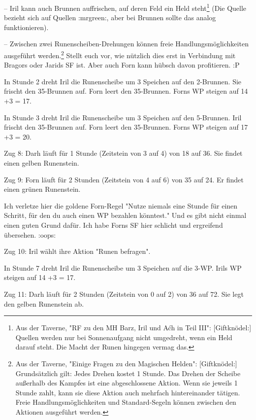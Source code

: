 \documentclass[10pt, a4paper, oneside]{book}
\begin{document}
{– Iril kann auch Brunnen auffrischen, auf deren Feld ein Held steht\footnote{Aus der Taverne, "RF zu den MH Barz, Iril und Aćh in Teil III": [Giftknödel:] Quellen werden nur bei Sonnenaufgang nicht umgedreht, wenn ein Held darauf steht. Die Macht der Runen hingegen vermag das.} (Die Quelle bezieht sich auf Quellen :mrgreen:, aber bei Brunnen sollte das analog funktionieren).

– Zwischen zwei Runenscheiben-Drehungen können freie Handlungsmöglichkeiten ausgeführt werden.\footnote{Aus der Taverne, "Einige Fragen zu den Magischen Helden": [Giftknödel:] Grundsätzlich gilt: Jedes Drehen kostet 1 Stunde. Das Drehen der Scheibe außerhalb des Kampfes ist eine abgeschlossene Aktion. Wenn sie jeweils 1 Stunde zahlt, kann sie diese Aktion auch mehrfach hintereinander tätigen.
Freie Handlungsmöglichkeiten und Standard-Segeln können zwischen den Aktionen ausgeführt werden.} Stellt euch vor, wie nützlich dies erst in Verbindung mit Bragors oder Jarids SF ist. Aber auch Forn kann hübsch davon profitieren. :P

In Stunde 2 dreht Iril die Runenscheibe um 3 Speichen auf den 2-Brunnen. Sie frischt den 35-Brunnen auf. Forn leert den 35-Brunnen. Forns WP steigen auf 14 +3 = 17.

In Stunde 3 dreht Iril die Runenscheibe um 3 Speichen auf den 5-Brunnen. Iril frischt den 35-Brunnen auf. Forn leert den 35-Brunnen. Forns WP steigen auf 17 +3 = 20.



Zug 8: Darh läuft für 1 Stunde (Zeitstein von 3 auf 4) von 18 auf 36. Sie findet einen gelben Runenstein.



Zug 9: Forn läuft für 2 Stunden (Zeitstein von 4 auf 6) von 35 auf 24. Er findet einen grünen Runenstein.

Ich verletze hier die goldene Forn-Regel "Nutze niemals eine Stunde für einen Schritt, für den du auch einen WP bezahlen könntest." Und es gibt nicht einmal einen guten Grund dafür. Ich habe Forns SF hier schlicht und ergreifend übersehen. :oops:



Zug 10: Iril wählt ihre Aktion "Runen befragen".

In Stunde 7 dreht Iril die Runenscheibe um 3 Speichen auf die 3-WP. Irils WP steigen auf 14 +3 = 17.



Zug 11: Darh läuft für 2 Stunden (Zeitstein von 0 auf 2) von 36 auf 72. Sie legt den gelben Runenstein ab.



}
\end{document}
